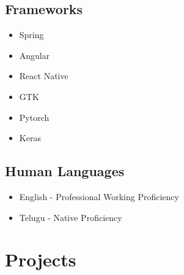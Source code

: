 \documentclass{article}
\begin{document}
\subsection{Frameworks}
\begin{multicols}{3}
    \begin{itemize}
    	\item Spring
    	\item Angular
        \item React Native
        \item GTK
        \item Pytorch
        \item Keras
    \end{itemize}
\end{multicols}


\subsection{Human Languages}
\begin{itemize}
    \item English - Professional Working Proficiency
    \item Telugu - Native Proficiency
\end{itemize}

\section{Projects}
\end{document}
